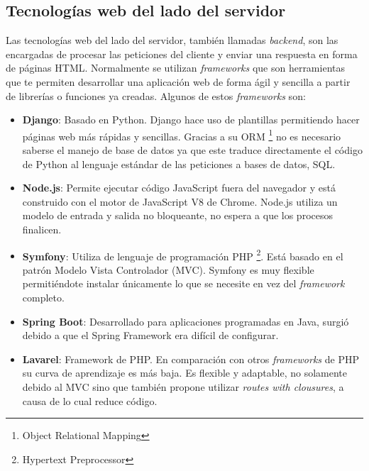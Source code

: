 \subsection{Tecnologías web del lado del servidor}
Las tecnologías web del lado del servidor, también llamadas \textit{backend}, son las encargadas de procesar las peticiones del cliente y enviar una respuesta en forma de páginas HTML. Normalmente se utilizan \textit{frameworks }que son herramientas que te permiten desarrollar una aplicación web de forma ágil y sencilla a partir de librerías o funciones ya creadas. Algunos de estos \textit{frameworks} son:

\begin{itemize}
  \item \textbf{Django}: Basado en Python. Django hace uso de plantillas permitiendo hacer páginas web más rápidas y sencillas. Gracias a su ORM \footnote{Object Relational Mapping} no es necesario saberse el manejo de base de datos ya que este traduce directamente el código de Python al lenguaje estándar de las peticiones a bases de datos, SQL.
  \item \textbf{Node.js}: Permite ejecutar código JavaScript fuera del navegador y está construido con el motor de JavaScript V8 de Chrome. Node.js utiliza un modelo de entrada y salida no bloqueante, no espera a que los procesos finalicen.
  \item \textbf{Symfony}: Utiliza de lenguaje de programación PHP \footnote{Hypertext Preprocessor}. Está basado en el patrón Modelo Vista Controlador (MVC). Symfony es muy flexible permitiéndote instalar únicamente lo que se necesite en vez del \textit{framework} completo.
  \item \textbf{Spring Boot}: Desarrollado para aplicaciones programadas en Java, surgió debido a que el Spring Framework era difícil de configurar. 
\item \textbf{Lavarel}: Framework de PHP. En comparación con otros \textit{frameworks } de PHP su curva de aprendizaje es más baja. Es flexible y adaptable, no solamente debido al MVC sino que también propone utilizar \textit{routes with clousures}, a causa de lo cual reduce código.\cite{lavarel}
\end{itemize}

